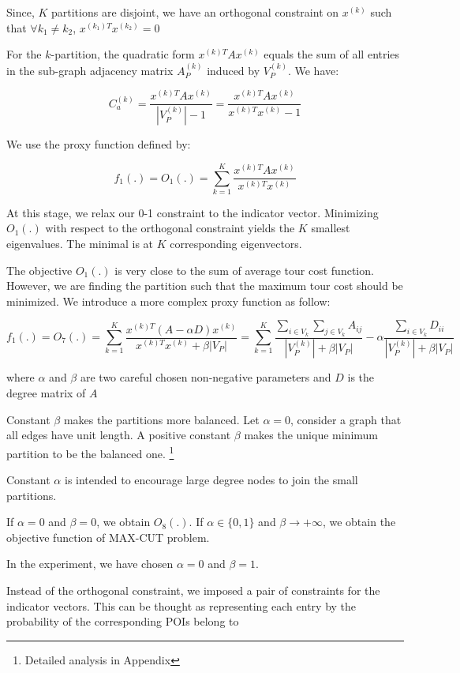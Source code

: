 Since, $K$ partitions are disjoint, we have an orthogonal constraint on $x^{(k)}$ such that $\forall k_1 \neq k_2$, $x^{(k_1)T} x^{(k_2)} = 0$

For the $k$-partition, the quadratic form $x^{(k)T} A x^{(k)}$ equals the sum of all entries in the sub-graph adjacency matrix $A_P^{(k)}$ induced by $V_P^{(k)}$. We have:

\[
C_a^{(k)} = \frac{x^{(k)T} A x^{(k)}}{|V_P^{(k)}| - 1} = \frac{x^{(k)T} A x^{(k)}}{x^{(k)T} x^{(k)} - 1} 
\]

We use the proxy function defined by:

\[
f_1(.) = O_1(.) = \sum_{k=1}^{K} \frac{x^{(k)T} A x^{(k)}}{x^{(k)T} x^{(k)}}
\]

At this stage, we relax our 0-1 constraint to the indicator vector. Minimizing $O_1(.)$ with respect to the orthogonal constraint yields the $K$ smallest eigenvalues. The minimal is at $K$ corresponding eigenvectors.

The objective $O_1(.)$ is very close to the sum of average tour cost function. However, we are finding the partition such that the maximum tour cost should be minimized. We introduce a more complex proxy function as follow:

\[
f_1(.) = O_7(.) = 
\sum_{k=1}^{K} \frac{x^{(k)T} (A - \alpha D) x^{(k)}}{x^{(k)T} x^{(k)} + \beta |V_P|}
=
\sum_{k=1}^{K} \frac{\sum_{i \in V_k} \sum_{j \in V_k} A_{ij}}{|V_P^{(k)}| + \beta |V_P|} - \alpha \frac{\sum_{i \in V_k} D_{ii}}{|V_P^{(k)}| + \beta |V_P|}
\]

where $\alpha$ and $\beta$ are two careful chosen non-negative parameters and $D$ is the degree matrix of $A$

Constant $\beta$ makes the partitions more balanced. Let $\alpha = 0$, consider a graph that all edges have unit length. A positive constant $\beta$ makes the unique minimum partition to be the balanced one. \footnote{Detailed analysis in Appendix}

Constant $\alpha$ is intended to encourage large degree nodes to join the small partitions.

If $\alpha = 0$ and $\beta = 0$, we obtain $O_8(.)$. If $\alpha \in \{0, 1\}$ and $\beta \to +\infty$, we obtain the objective function of MAX-CUT problem.

In the experiment, we have chosen $\alpha = 0$ and $\beta = 1$.

Instead of the orthogonal constraint, we imposed a pair of constraints for the indicator vectors. This can be thought as representing each entry by the probability of the corresponding POIs belong to

